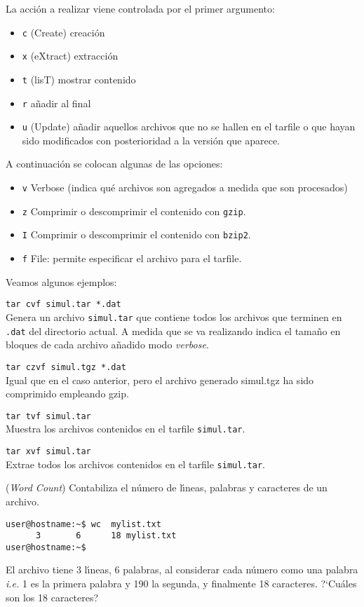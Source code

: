 La acci{\'o}n a realizar viene controlada por el primer argumento:
\begin{itemize}
\item \verb+c+ (Create) creaci{\'o}n
\item \verb+x+ (eXtract) extracci{\'o}n
\item \verb+t+ (lisT) mostrar contenido 
\item \verb+r+ a{\~n}adir al final 
\item \verb+u+ (Update) a{\~n}adir aquellos archivos que no se hallen en el tarfile o que
  hayan sido modificados con posterioridad a la versi{\'o}n que aparece.
\end{itemize}
A continuaci{\'o}n se colocan algunas de las opciones:
\begin{itemize}
\item \verb+v+ Verbose (indica qu\'e archivos son agregados a medida
  que son procesados) 
\item \verb+z+ Comprimir o descomprimir el contenido con \verb+gzip+.
\item \verb+I+ Comprimir o descomprimir el contenido con \verb+bzip2+.
\item \verb+f+ File: permite especificar el archivo para el tarfile.
\end{itemize}
Veamos algunos ejemplos:

\verb+tar cvf simul.tar *.dat+\\
Genera un archivo \verb+simul.tar+ que contiene todos los archivos que
terminen en \verb+.dat+ del directorio actual. A medida que se va
realizando indica el tama{\~n}o en bloques de cada
archivo a{\~n}adido modo {\it verbose}.

\verb+tar czvf simul.tgz *.dat+\\
Igual que en el caso anterior, pero el archivo generado simul.tgz ha
sido comprimido empleando gzip.

\verb+tar tvf simul.tar+\\
Muestra los archivos contenidos en el tarfile \verb+simul.tar+.

\verb+tar xvf simul.tar+\\
Extrae todos los archivos contenidos en el tarfile \verb+simul.tar+.

\vspace{0.3cm}

\noindent
{} ({\it Word Count})
Contabiliza el n{\'u}mero de l{\'\i}neas, palabras y caracteres de un archivo.
\begin{verbatim}
user@hostname:~$ wc  mylist.txt
      3       6      18 mylist.txt
user@hostname:~$
\end{verbatim}
El archivo tiene 3 l{\'\i}neas, 6 palabras, al considerar cada n{\'u}mero como
una palabra {\it i.e.} 1 es la primera palabra y 190 la segunda, y
finalmente 18 caracteres. ?`Cu{\'a}les son los 18 caracteres?


